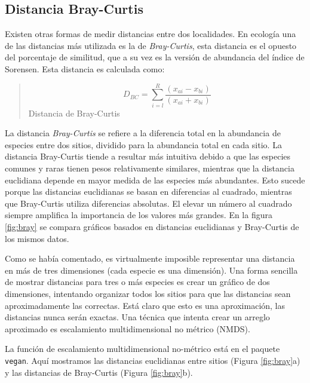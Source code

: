\documentclass[
]{article}
\begin{document}
\hypertarget{distancia-bray-curtis}{%
\subsection{Distancia Bray-Curtis}\label{distancia-bray-curtis}}

Existen otras formas de medir distancias entre dos localidades. En ecología una de las distancias más utilizada es la de \emph{Bray-Curtis}, esta distancia es el opuesto del porcentaje de similitud, que a su vez es la versión de abundancia del índice de Sorensen. Esta distancia es calculada como:

\begin{quote}
\[D_{BC} = \sum_{i=l}^R \frac{(x_{ai} - x_{bi})}{(x_{ai} + x_{bi})}\]
Distancia de Bray-Curtis
\end{quote}

La distancia \emph{Bray-Curtis} se refiere a la diferencia total en la abundancia de especies entre dos sitios, dividido para la abundancia total en cada sitio. La distancia Bray-Curtis tiende a resultar más intuitiva debido a que las especies comunes y raras tienen pesos relativamente similares, mientras que la distancia euclidiana depende en mayor medida de las especies más abundantes. Esto sucede porque las distancias euclidianas se basan en diferencias al cuadrado, mientras que Bray-Curtis utiliza diferencias absolutas. El elevar un número al cuadrado siempre amplifica la importancia de los valores más grandes. En la figura \ref{fig:bray} se compara gráficos basados en distancias euclidianas y Bray-Curtis de los mismos datos.

Como se había comentado, es virtualmente imposible representar una distancia en más de tres dimensiones (cada especie es una dimensión). Una forma sencilla de mostrar distancias para tres o más especies es crear un gráfico de dos dimensiones, intentando organizar todos los sitios para que las distancias sean aproximadamente las correctas. Está claro que esto es una aproximación, las distancias nunca serán exactas. Una técnica que intenta crear un arreglo aproximado es escalamiento multidimensional no métrico (NMDS).

La función de escalamiento multidimensional no-métrico está en el paquete \texttt{vegan}. Aquí mostramos las distancias euclidianas entre sitios (Figura \ref{fig:bray}a) y las distancias de Bray-Curtis (Figura \ref{fig:bray}b).
\end{document}
